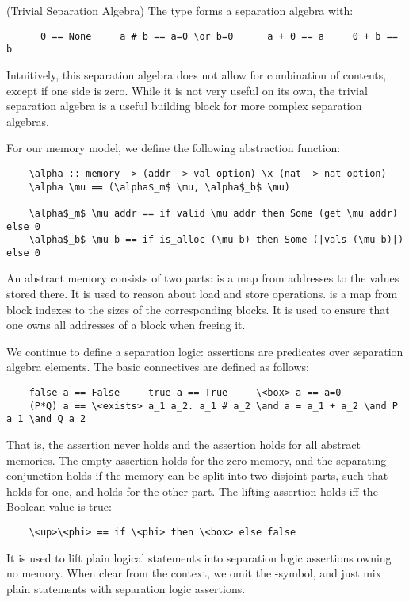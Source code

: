 \documentclass[a4paper,UKenglish,cleveref, autoref, thm-restate]{lipics-v2021}
\begin{document}
  \begin{example}(Trivial Separation Algebra)
    The type  forms a separation algebra with:
    \begin{lstlisting}
      0 == None     a # b == a=0 \or b=0      a + 0 == a     0 + b == b
    \end{lstlisting}
    Intuitively, this separation algebra does not allow for combination of contents, except if one side is zero.
    While it is not very useful on its own, the trivial separation algebra is a useful building block for
    more complex separation algebras.
  \end{example}

  For our memory model, we define the following abstraction function:
  \begin{lstlisting}
    \alpha :: memory -> (addr -> val option) \x (nat -> nat option)
    \alpha \mu == (\alpha$_m$ \mu, \alpha$_b$ \mu)

    \alpha$_m$ \mu addr == if valid \mu addr then Some (get \mu addr) else 0
    \alpha$_b$ \mu b == if is_alloc (\mu b) then Some (|vals (\mu b)|) else 0
  \end{lstlisting}
  An abstract memory \is{\alpha \mu} consists of two parts:
   is a map from addresses to the values stored there. It is used to reason about load and store operations.
   is a map from block indexes to the sizes of the corresponding blocks.
    It is used to ensure that one owns all addresses of a block when freeing it.

  We continue to define a separation logic: assertions are predicates over separation algebra elements.
  The basic connectives are defined as follows:
  \begin{lstlisting}
    false a == False     true a == True     \<box> a == a=0
    (P*Q) a == \<exists> a_1 a_2. a_1 # a_2 \and a = a_1 + a_2 \and P a_1 \and Q a_2
  \end{lstlisting}
  That is, the assertion  never holds and the assertion  holds for all abstract memories.
  The empty assertion  holds for the zero memory, and the separating conjunction 
  holds if the memory can be split into two disjoint parts, such that  holds for one,
  and  holds for the other part. The lifting assertion  holds iff the Boolean value  is true:
  \begin{lstlisting}
    \<up>\<phi> == if \<phi> then \<box> else false
  \end{lstlisting}
  It is used to lift plain logical statements into separation logic assertions owning no memory.
  When clear from the context, we omit the -symbol, and just mix plain statements with separation logic assertions.
\end{document}
